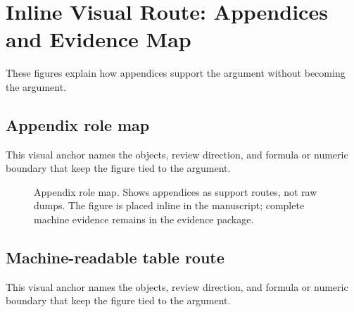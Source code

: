 \section{Inline Visual Route: Appendices and Evidence Map}

These figures explain how appendices support the argument without becoming the argument.


\subsection{Appendix role map}

This visual anchor names the objects, review direction, and formula or numeric boundary that keep the figure tied to the argument.


\begin{figure}[htbp]

\centering


\caption{Appendix role map. Shows appendices as support routes, not raw dumps. The figure is placed inline in the manuscript; complete machine evidence remains in the evidence package.}

\label{fig:r005-inline-28f_oc133_inline_figures_appendix_route-1}

\end{figure}

\subsection{Machine-readable table route}

This visual anchor names the objects, review direction, and formula or numeric boundary that keep the figure tied to the argument.



